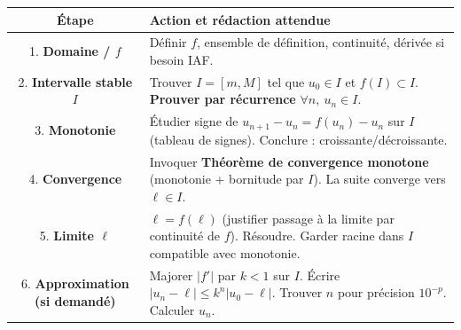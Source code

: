 \documentclass[11pt]{article}
\begin{document}
\begin{aretenir}
\begin{center}
\begin{tabularx}{\linewidth}{|c|X|}
\hline
\rowcolor{popblueL} \textbf{Étape} & \textbf{Action et rédaction attendue} \\
\hline
1. \textbf{Domaine / $f$} & Définir $f$, ensemble de définition, continuité, dérivée si besoin IAF. \\
\hline
2. \textbf{Intervalle stable $I$} & Trouver $I=[m,M]$ tel que $u_0\in I$ et $f(I)\subset I$. \textbf{Prouver par récurrence} $\forall n,\ u_n\in I$. \\
\hline
3. \textbf{Monotonie} & Étudier signe de $u_{n+1}-u_n = f(u_n)-u_n$ sur $I$ (tableau de signes). Conclure : croissante/décroissante. \\
\hline
4. \textbf{Convergence} & Invoquer \textbf{Théorème de convergence monotone} (monotonie + bornitude par $I$). La suite converge vers $\ell\in I$. \\
\hline
5. \textbf{Limite $\ell$} & $\ell=f(\ell)$ (justifier passage à la limite par continuité de $f$). Résoudre. Garder racine dans $I$ compatible avec monotonie. \\
\hline
6. \textbf{Approximation (si demandé)} & Majorer $|f'|$ par $k<1$ sur $I$. Écrire $|u_n-\ell|\le k^n|u_0-\ell|$. Trouver $n$ pour précision $10^{-p}$. Calculer $u_n$. \\
\hline
\end{tabularx}
\end{center}
\end{aretenir}
\end{document}
